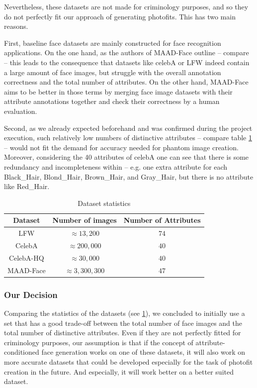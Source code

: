 \documentclass[12pt, a4paper]{article}
\begin{document}
Nevertheless, these datasets are not made for criminology purposes, and so they do not perfectly fit our approach of
generating photofits. This has two main reasons.

First, baseline face datasets are mainly constructed for face recognition applications. On the one hand, as the authors
of MAAD-Face outline -- compare \cite{DBLP2} -- this leads to the consequence that datasets like
celebA or LFW indeed contain a large amount of face images, but struggle with the overall annotation correctness and the total number of attributes.
On the other hand, MAAD-Face aims to be better in those terms by merging
face image datasets with their attribute annotations together and check their correctness by a human evaluation.

Second, as we already expected beforehand and was confirmed during the project execution, such relatively low numbers of
distinctive attributes -- compare table \ref{tab:dataset-stats} -- would not fit the demand for accuracy needed for phantom image creation.
Moreover, considering the 40 attributes of celebA one can see that
there is some redundancy and incompleteness within -- e.g. one extra attribute for each Black\_Hair, Blond\_Hair,
Brown\_Hair, and Gray\_Hair, but there is no attribute like  Red\_Hair.

\begin{table}[h]
    \centering
        \begin{tabular}{|c|c|c|}
            \hline
            Dataset & Number of images & Number of Attributes \\
            \hline
            LFW & $\approx 13,200$ & $74$ \\
            CelebA & $\approx 200,000$ & $40$ \\
            CelebA-HQ & $\approx 30,000$ & $40$ \\
            MAAD-Face & $\approx 3,300,300$ & $47$ \\
            \hline
        \end{tabular}
        \caption{Dataset statistics}
        \label{tab:dataset-stats}
    \end{table}

\subsubsection{Our Decision}
Comparing the statistics of the datasets (see \ref{tab:dataset-stats}), we concluded to initially use a set that has a good trade-off
between the total number of face images and the total number of distinctive attributes. Even if they are not perfectly
fitted for criminology purposes, our assumption is that if the concept of attribute-conditioned face generation works on
one of these datasets, it will also work on more accurate datasets that could be developed especially for the task of
photofit creation in the future. And especially, it will work better on a better suited dataset.
\end{document}
